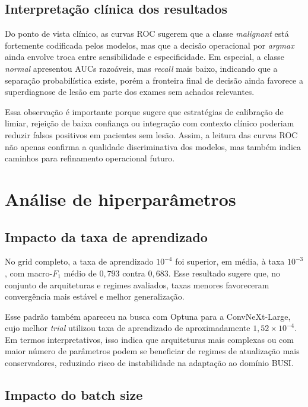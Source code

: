 \documentclass[tcc,capa]{texufpel}
\begin{document}
\subsection{Interpretação clínica dos resultados}

Do ponto de vista clínico, as curvas ROC sugerem que a classe \textit{malignant} está fortemente codificada pelos modelos, mas que a decisão operacional por \textit{argmax} ainda envolve troca entre sensibilidade e especificidade. Em especial, a classe \textit{normal} apresentou AUCs razoáveis, mas \textit{recall} mais baixo, indicando que a separação probabilística existe, porém a fronteira final de decisão ainda favorece a superdiagnose de lesão em parte dos exames sem achados relevantes.

Essa observação é importante porque sugere que estratégias de calibração de limiar, rejeição de baixa confiança ou integração com contexto clínico poderiam reduzir falsos positivos em pacientes sem lesão. Assim, a leitura das curvas ROC não apenas confirma a qualidade discriminativa dos modelos, mas também indica caminhos para refinamento operacional futuro.

\section{Análise de hiperparâmetros}

\subsection{Impacto da taxa de aprendizado}

No grid completo, a taxa de aprendizado \(10^{-4}\) foi superior, em média, à taxa \(10^{-3}\), com macro-\(F_1\) médio de \(0{,}793\) contra \(0{,}683\). Esse resultado sugere que, no conjunto de arquiteturas e regimes avaliados, taxas menores favoreceram convergência mais estável e melhor generalização.

Esse padrão também apareceu na busca com Optuna para a ConvNeXt-Large, cujo melhor \textit{trial} utilizou taxa de aprendizado de aproximadamente \(1{,}52 \times 10^{-4}\). Em termos interpretativos, isso indica que arquiteturas mais complexas ou com maior número de parâmetros podem se beneficiar de regimes de atualização mais conservadores, reduzindo risco de instabilidade na adaptação ao domínio BUSI.

\subsection{Impacto do batch size}
\end{document}
